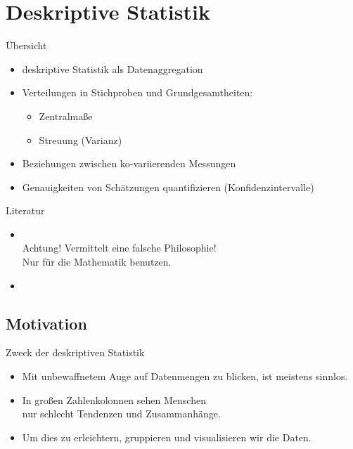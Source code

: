 \section[Deskriptiv]{Deskriptive Statistik}

\begin{frame}
  {Übersicht}
  \begin{itemize}[<+->]
    \item deskriptive Statistik als Datenaggregation
    \item Verteilungen in Stichproben und Grundgesamtheiten:
      \begin{itemize}
	\item Zentralmaße
	\item Streuung (Varianz)
      \end{itemize}
    \item Beziehungen zwischen ko-variierenden Messungen
    \item Genauigkeiten von Schätzungen quantifizieren (Konfidenzintervalle)
  \end{itemize}
\end{frame}

\begin{frame}
  {Literatur}
  \begin{itemize}
    \item \citet{GravetterWallnau2007}\\
      Achtung! Vermittelt eine falsche Philosophie!\\
      Nur für die Mathematik benutzen.
    \item \citet{Bortz2010}
  \end{itemize}
\end{frame}

\subsection{Motivation}

\begin{frame}
  {Zweck der deskriptiven Statistik}
  \begin{itemize}[<+->]
    \item Mit unbewaffnetem Auge auf Datenmengen zu blicken, ist meistens sinnlos.
    \item In großen Zahlenkolonnen sehen Menschen\\
      nur schlecht Tendenzen und Zusammanhänge.
    \item Um dies zu erleichtern, gruppieren und visualisieren wir die Daten.
  \end{itemize}
\end{frame}



